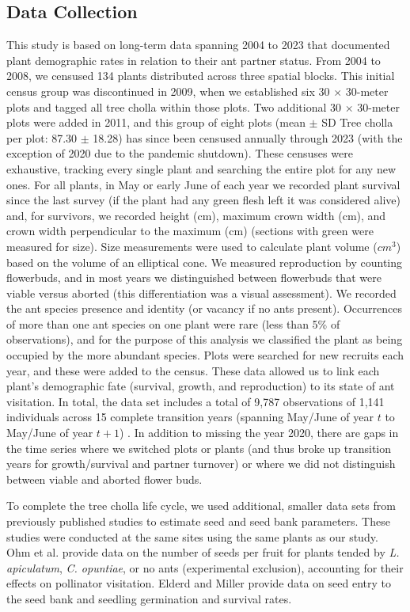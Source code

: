 \documentclass[11pt]{article}
\begin{document}
\subsection*{Data Collection}
This study is based on long-term data spanning 2004 to 2023 that documented plant demographic rates in relation to their ant partner status. 
From 2004 to 2008, we censused 134 plants distributed across three spatial blocks. 
This initial census group was discontinued in 2009, when we established six 30 $\times$ 30-meter plots and tagged all tree cholla within those plots. 
Two additional 30 $\times$ 30-meter plots were added in 2011, and this group of eight plots (mean $\pm$ SD Tree cholla per plot: 87.30 $\pm$ 18.28) has since been censused annually through 2023 (with the exception of 2020 due to the pandemic shutdown). 
These censuses were exhaustive, tracking every single plant and searching the entire plot for any new ones. 
For all plants, in May or early June of each year we recorded plant survival since the last survey (if the plant had any green flesh left it was considered alive) and, for survivors, we recorded height (cm), maximum crown width (cm), and crown width perpendicular to the maximum (cm) (sections with green were measured for size).
Size measurements were used to calculate plant volume ($cm^3$) based on the volume of an elliptical cone. 
We measured reproduction by counting flowerbuds, and in most years we distinguished between flowerbuds that were viable versus aborted (this differentiation was a visual assessment). 
We recorded the ant species presence and identity (or vacancy if no ants present).
Occurrences of more than one ant species on one plant were rare (less than 5\% of observations), and for the purpose of this analysis we classified the plant as being occupied by the more abundant species. 
Plots were searched for new recruits each year, and these were added to the census.
These data allowed us to link each plant's demographic fate (survival, growth, and reproduction) to its state of ant visitation. 
In total, the data set includes a total of 9,787 observations of 1,141 individuals across 15 complete transition years (spanning May/June of year $t$ to May/June of year $t+1$) \citep{DataCholla}. 
In addition to missing the year 2020, there are gaps in the time series where we switched plots or plants (and thus broke up transition years for growth/survival and partner turnover) or where we did not distinguish between viable and aborted flower buds.

To complete the tree cholla life cycle, we used additional, smaller data sets from previously published studies to estimate seed and seed bank parameters. 
These studies were conducted at the same sites using the same plants as our study. 
Ohm et al. \citeyear{Ohm2014} provide data on the number of seeds per fruit for plants tended by \textit{L. apiculatum}, \textit{C. opuntiae}, or no ants (experimental exclusion), accounting for their effects on pollinator visitation. 
Elderd and Miller \citeyear{elderd2016quantifying} provide data on seed entry to the seed bank and seedling germination and survival rates. 
\end{document}
